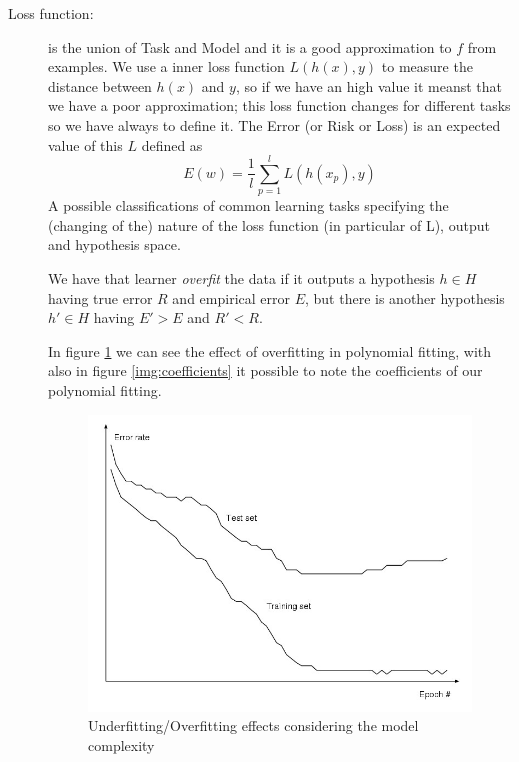 \begin{description}
    \item [Loss function: ] is the union of Task and Model and it is a good approximation to $f$ from examples.\newline
                            We use a inner loss function $L(h(x), y)$ to measure the distance between $h(x)$ and $y$,
                            so if we have an high value it meanst that we have a poor approximation; this loss 
                            function changes for different tasks so we have always to define it.\newline
                            The Error (or Risk or Loss) is an expected value of this $L$ defined as 
                            \[ E(w) = \frac{1}{l} \sum _{p=1}^l L(h(x_p), y) \]
                            A possible classifications of common learning tasks specifying the 
                            (changing of the) nature of the loss function (in particular of L),
                            output and hypothesis space.
                            
                            \begin{defi}[overfitting]
                            We have that learner \emph{overfit} the data if it outputs a hypothesis $h \in H$
                            having true error $R$ and empirical error $E$, but there is another hypothesis $h' \in H$
                            having $E' > E$ and $R' < R$.
                            \end{defi}
                            In figure \ref{img:overfitting} we can see the effect of overfitting in polynomial
                            fitting, with also in figure \ref{img:coefficients} it possible to note the 
                            coefficients of our polynomial fitting.

			    \begin{figure}
    				\caption{Underfitting/Overfitting effects considering the model complexity}
    				\label{img:overfitting}
    				\includegraphics[width=\textwidth]{images/overfitting}
			    \end{figure}


\end{description}
